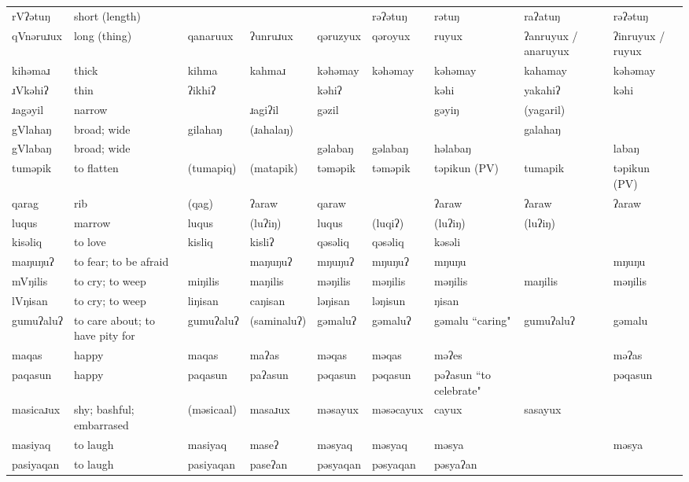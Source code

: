 \begin{landscape}
\begin{longtable}{*{9}{p{}}}
\text{*}rVʔətuŋ & short (length) &  &  &  & rəʔətuŋ & rətuŋ & raʔatuŋ & rəʔətuŋ\\
\text{*}qVnəruɹux & long (thing) & qanaruux & ʔunruɹux & qəruzyux & qəroyux & ruyux & ʔanruyux / anaruyux & ʔinruyux / ruyux\\
\text{*}kihəmaɹ & thick & kihma & kahmaɹ & kəhəmay & kəhəmay & kəhəmay & kahamay & kəhəmay\\
\text{*}ɹVkəhiʔ & thin & ʔikhiʔ &  & kəhiʔ &  & kəhi & yakahiʔ & kəhi\\
\text{*}ɹagəyil & narrow &  & ɹagiʔil & gəzil &  & gəyiŋ & (yagaril) & \\
\text{*}gVlahaŋ & broad; wide & gilahaŋ & (ɹahalaŋ) &  &  &  & galahaŋ & \\
\text{*}gVlabaŋ & broad; wide &  &  & gəlabaŋ & gəlabaŋ & həlabaŋ &  & labaŋ\\
\text{*}tuməpik & to flatten & (tumapiq) & (matapik) & təməpik & təməpik & təpikun (PV) & tumapik & təpikun (PV)\\
\text{*}qarag & rib & (qag) & ʔaraw & qaraw &  & ʔaraw & ʔaraw & ʔaraw\\
\text{*}luqus & marrow & luqus & (luʔiŋ) & luqus & (luqiʔ) & (luʔiŋ) & (luʔiŋ) & \\
\text{*}kisəliq & to love & kisliq & kisliʔ & qəsəliq & qəsəliq & kəsəli &  & \\
\text{*}maŋuŋuʔ & to fear; to be afraid &  & maŋuŋuʔ & mŋuŋuʔ & mŋuŋuʔ & mŋuŋu &  & mŋuŋu\\
\text{*}mVŋilis & to cry; to weep & miŋilis & maŋilis & məŋilis & məŋilis & məŋilis & maŋilis & məŋilis\\
\text{*}lVŋisan & to cry; to weep & liŋisan & caŋisan & ləŋisan & ləŋisun & ŋisan &  & \\
\text{*}gumuʔaluʔ & to care about; to have pity for & gumuʔaluʔ & (saminaluʔ) & gəmaluʔ & gəmaluʔ & gəmalu ``caring" & gumuʔaluʔ & gəmalu\\
\text{*}maqas & happy & maqas & maʔas & məqas & məqas & məʔes &  & məʔas\\
\text{*}paqasun & happy & paqasun & paʔasun & pəqasun & pəqasun & pəʔasun ``to celebrate" &  & pəqasun\\
\text{*}masicaɹux & shy; bashful; embarrased & (məsicaal) & masaɹux & məsayux & məsəcayux & cayux & sasayux & \\
\text{*}masiyaq & to laugh & masiyaq & maseʔ & məsyaq & məsyaq & məsya &  & məsya\\
\text{*}pasiyaqan & to laugh & pasiyaqan & paseʔan & pəsyaqan & pəsyaqan & pəsyaʔan &  & \\

\end{longtable}
\end{landscape}
